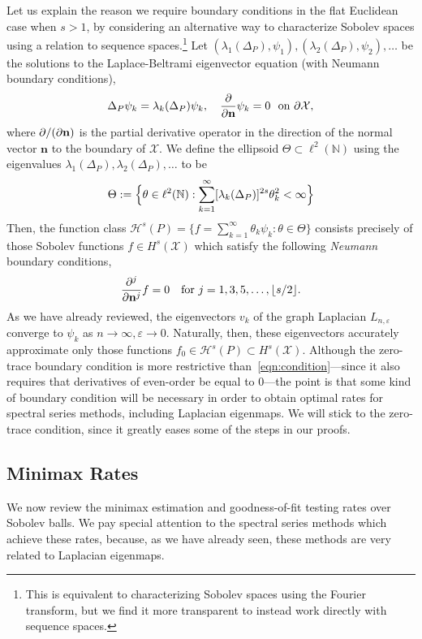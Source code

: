 \documentclass{article}
\newcommand{\floor}[1]{\left\lfloor #1 \right\rfloor}
\newcommand{\1}{\mathbf{1}}
\newcommand{\mc}[1]{\mathcal{#1}}
\theoremstyle{alden}
\theoremstyle{aldenthm}
\theoremstyle{definition}
\theoremstyle{remark}
\begin{document}
Let us explain the reason we require boundary conditions in the flat Euclidean case when $s > 1$, by considering an alternative way to characterize Sobolev spaces using a relation to sequence spaces.\footnote{This is equivalent to characterizing Sobolev spaces using the Fourier transform, but we find it more transparent to instead work directly with sequence spaces.} Let $(\lambda_1(\Delta_P),\psi_1),(\lambda_2(\Delta_P),\psi_2),\ldots$ be the solutions to the Laplace-Beltrami eigenvector equation (with Neumann boundary conditions), 
\begin{equation*}
\Delta_P\psi_k = \lambda_{k}(\Delta_P) \psi_k, \quad \frac{\partial}{\partial {\bf n}}\psi_k = 0~~\textrm{on $\partial \mc{X}$},
\end{equation*}
where $\partial/(\partial {\bf n})$ is the partial derivative operator in the direction of the normal vector $\mathbf{n}$ to the boundary of $\mc{X}$.
We define the ellipsoid $\Theta \subset \ell^2(\mathbb{N})$  using the eigenvalues $\lambda_1(\Delta_P),\lambda_2(\Delta_P),\ldots$ to be
\begin{equation*}
\Theta := \Bigl\{\theta \in \ell^2(\mathbb{N}): \sum_{k = 1}^{\infty} [\lambda_k(\Delta_P)]^{2s} \theta_k^2 < \infty\Bigr\}
\end{equation*}
Then, the function class $\mc{H}^s(P) = \{f = \sum_{k = 1}^{\infty} \theta_k \psi_k: \theta \in \Theta\}$ consists precisely of those Sobolev functions $f \in H^s(\mc{X})$ which satisfy the following \emph{Neumann} boundary conditions,
\begin{equation}
\label{eqn:condition}
\frac{\partial^j}{\partial {\bf n}^j}f = 0 \quad \textrm{for $j = 1,3,5,\ldots,\floor{s/2}$.}
\end{equation}
As we have already reviewed, the eigenvectors $v_k$ of the graph Laplacian $L_{n,\varepsilon}$ converge to $\psi_k$ as $n \to \infty, \varepsilon \to 0$. Naturally, then, these eigenvectors accurately approximate only those functions $f_0 \in \mc{H}^s(P) \subset H^s(\mc{X})$. Although the zero-trace boundary condition is more restrictive than~\eqref{eqn:condition}---since it also requires that derivatives of even-order be equal to $0$---the point is that some kind of boundary condition will be necessary in order to obtain optimal rates for spectral series methods, including Laplacian eigenmaps. We will stick to the zero-trace condition, since it greatly eases some of the steps in our proofs.

\subsection{Minimax Rates}
\label{subsec:minimax_rates_sobolev}
We now review the minimax estimation and goodness-of-fit testing rates over Sobolev balls. We pay special attention to the spectral series methods which achieve these rates, because, as we have already seen, these methods are very related to Laplacian eigenmaps.
\end{document}
